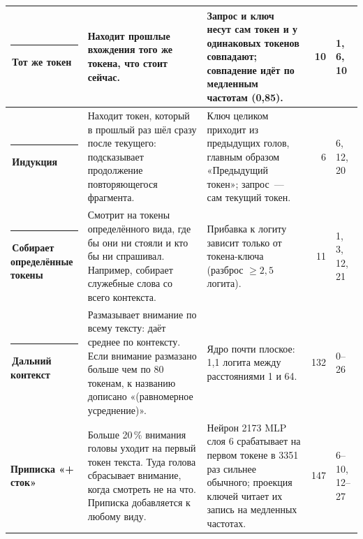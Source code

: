 \documentclass[10pt]{article}
\begin{document}
\begin{center}
{\begin{tabular}{|p{4.3cm}|p{8.9cm}|p{7.3cm}|r|p{3.0cm}|}
\textcolor[HTML]{E87BA4}{\rule{0.62em}{0.62em}}\,\textbf{Тот же токен} & Находит прошлые вхождения того же токена, что стоит сейчас. & Запрос и ключ несут сам токен и у одинаковых токенов совпадают; совпадение идёт по медленным частотам (0,85). & 10 & 1, 6, 10 \\ \hline
\textcolor[HTML]{008300}{\rule{0.62em}{0.62em}}\,\textbf{Индукция} & Находит токен, который в прошлый раз шёл сразу после текущего: подсказывает продолжение повторяющегося фрагмента. & Ключ целиком приходит из предыдущих голов, главным образом «Предыдущий токен»; запрос~— сам текущий токен. & 6 & 6, 12, 20 \\ \hline
\textcolor[HTML]{6250D6}{\rule{0.62em}{0.62em}}\,\textbf{Собирает определённые токены} & Смотрит на токены определённого вида, где бы они ни стояли и кто бы ни спрашивал. Например, собирает служебные слова со всего контекста. & Прибавка к логиту зависит только от токена-ключа (разброс $\ge 2{,}5$ логита). & 11 & 1, 3, 12, 21 \\ \hline
\textcolor[HTML]{C3C2B7}{\rule{0.62em}{0.62em}}\,\textbf{Дальний контекст} & Размазывает внимание по всему тексту: даёт среднее по контексту. Если внимание размазано больше чем по 80 токенам, к названию дописано «(равномерное усреднение)». & Ядро почти плоское: 1,1 логита между расстояниями 1 и 64. & 132 & \mbox{0–26} \\ \hline
\hline \textbf{Приписка «+ сток»} & Больше 20\,\% внимания головы уходит на первый токен текста. Туда голова сбрасывает внимание, когда смотреть не на что. Приписка добавляется к любому виду. & Нейрон 2173 MLP слоя 6 срабатывает на первом токене в 3351 раз сильнее обычного; проекция ключей читает их запись на медленных частотах. & 147 & \mbox{6–10}, \mbox{12–27} \\ \hline
\hline\end{tabular}}\end{center}
\end{document}
